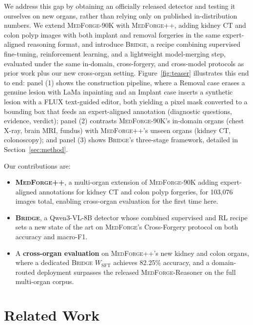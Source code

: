 \documentclass[10pt,twocolumn,letterpaper]{article}
\newcommand{\bridge}{\textsc{Bridge}}
\newcommand{\medforge}{\textsc{MedForge}}
\newcommand{\medforgepp}{\textsc{MedForge++}}
\begin{document}
We address this gap by obtaining an officially released detector and testing it ourselves on new organs, rather than relying only on published in-distribution numbers. We extend \medforge{}-90K with \medforgepp{}, adding kidney CT and colon polyp images with both implant and removal forgeries in the same expert-aligned reasoning format, and introduce \bridge{}, a recipe combining supervised fine-tuning, reinforcement learning, and a lightweight model-merging step, evaluated under the same in-domain, cross-forgery, and cross-model protocols as prior work plus our new cross-organ setting. Figure~\ref{fig:teaser} illustrates this end to end: panel (1) shows the construction pipeline, where a Removal case erases a genuine lesion with LaMa inpainting and an Implant case inserts a synthetic lesion with a FLUX text-guided editor, both yielding a pixel mask converted to a bounding box that feeds an expert-aligned annotation (diagnostic questions, evidence, verdict); panel (2) contrasts \medforge{}-90K's in-domain organs (chest X-ray, brain MRI, fundus) with \medforgepp{}'s unseen organs (kidney CT, colonoscopy); and panel (3) shows \bridge{}'s three-stage framework, detailed in Section~\ref{sec:method}.

Our contributions are:
\begin{itemize}
\setlength{\itemsep}{1pt}
\setlength{\parskip}{0pt}
    \item \textbf{\medforgepp{}}, a multi-organ extension of \medforge{}-90K adding expert-aligned annotations for kidney CT and colon polyp forgeries, for 103{,}076 images total, enabling cross-organ evaluation for the first time here.
    \item \textbf{\bridge{}}, a Qwen3-VL-8B detector whose combined supervised and RL recipe sets a new state of the art on \medforge{}'s Cross-Forgery protocol on both accuracy and macro-F1.
    \item A \textbf{cross-organ evaluation} on \medforgepp{}'s new kidney and colon organs, where a dedicated \bridge{} $W_{\mathrm{SFT}}$ achieves 82.25\% accuracy, and a domain-routed deployment surpasses the released \medforge{}-Reasoner on the full multi-organ corpus.
\end{itemize}

\section{Related Work}
\label{sec:related}
\end{document}
